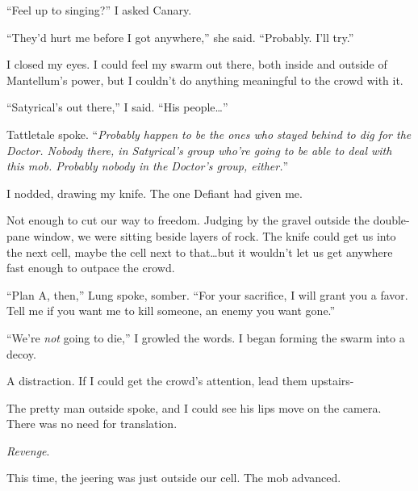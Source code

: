 ``Feel up to singing?'' I asked Canary.



``They'd hurt me before I got anywhere,'' she said.  ``Probably.  I'll try.''



I closed my eyes.  I could feel my swarm out there, both inside and outside of Mantellum's power, but I couldn't do anything meaningful to the crowd with it.



``Satyrical's out there,'' I said.  ``His people\ldots''



Tattletale spoke.  ``\emph{Probably happen to be the ones who stayed behind to dig for the Doctor.  Nobody there, in Satyrical's group who're going to be able to deal with this mob.  Probably nobody in the Doctor's group, either.}''



I nodded, drawing my knife.  The one Defiant had given me.



Not enough to cut our way to freedom.  Judging by the gravel outside the double-pane window, we were sitting beside layers of rock.  The knife could get us into the next cell, maybe the cell next to that\ldots but it wouldn't let us get anywhere fast enough to outpace the crowd.



``Plan A, then,'' Lung spoke, somber.  ``For your sacrifice, I will grant you a favor.  Tell me if you want me to kill someone, an enemy you want gone.''



``We're \emph{not} going to die,'' I growled the words.  I began forming the swarm into a decoy.



A distraction.  If I could get the crowd's attention, lead them upstairs-



The pretty man outside spoke, and I could see his lips move on the camera.  There was no need for translation.



\emph{Revenge}.



This time, the jeering was just outside our cell.  The mob advanced.





